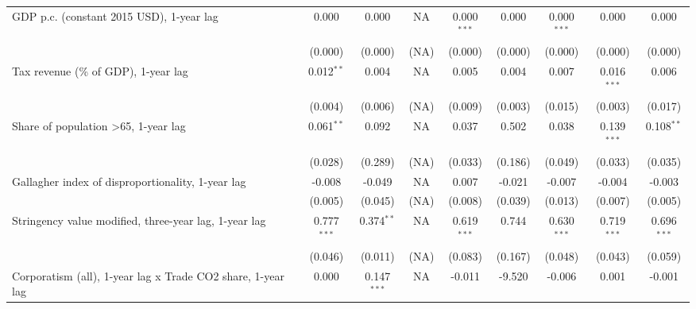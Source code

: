 \begin{table}[htbp]
\begin{tabular}{lcccccccc}
      GDP p.c. (constant 2015 USD), 1-year lag                    & 0.000         & 0.000                     & NA           & 0.000$^{***}$  & 0.000            & 0.000$^{***}$   & 0.000           & 0.000\\   
                                                                  & (0.000)       & (0.000)                   & (NA)         & (0.000)        & (0.000)          & (0.000)         & (0.000)         & (0.000)\\   
      Tax revenue (\% of GDP), 1-year lag                         & 0.012$^{**}$  & 0.004                     & NA           & 0.005          & 0.004            & 0.007           & 0.016$^{***}$   & 0.006\\   
                                                                  & (0.004)       & (0.006)                   & (NA)         & (0.009)        & (0.003)          & (0.015)         & (0.003)         & (0.017)\\   
      Share of population >65, 1-year lag                         & 0.061$^{**}$  & 0.092                     & NA           & 0.037          & 0.502            & 0.038           & 0.139$^{***}$   & 0.108$^{**}$\\   
                                                                  & (0.028)       & (0.289)                   & (NA)         & (0.033)        & (0.186)          & (0.049)         & (0.033)         & (0.035)\\   
      Gallagher index of disproportionality, 1-year lag           & -0.008        & -0.049                    & NA           & 0.007          & -0.021           & -0.007          & -0.004          & -0.003\\   
                                                                  & (0.005)       & (0.045)                   & (NA)         & (0.008)        & (0.039)          & (0.013)         & (0.007)         & (0.005)\\   
      Stringency value modified, three-year lag, 1-year lag       & 0.777$^{***}$ & 0.374$^{**}$              & NA           & 0.619$^{***}$  & 0.744            & 0.630$^{***}$   & 0.719$^{***}$   & 0.696$^{***}$\\   
                                                                  & (0.046)       & (0.011)                   & (NA)         & (0.083)        & (0.167)          & (0.048)         & (0.043)         & (0.059)\\   
      Corporatism (all), 1-year lag x Trade CO2 share, 1-year lag & 0.000         & 0.147$^{***}$             & NA           & -0.011         & -9.520           & -0.006          & 0.001           & -0.001\\   

\end{tabular}
\end{table}
